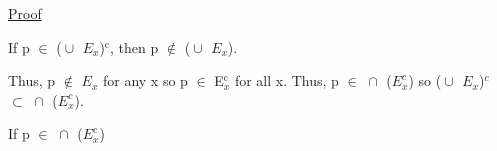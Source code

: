 	{ \color{magenta} \underline{Proof} } 
	
		If p $\in$ ($\cup_{}^{}$ $E_x$)$^\text{c}$, then p $\not \in$ ($\cup_{}^{}$ $E_x$).

		Thus, p $\not \in$ $E_x$ for any x so p $\in$ E$_x^\text{c}$ for all x.
		Thus, p $\in$ $\cap_{}^{}$ ($E_x^c$) so
		($\cup_{}^{}$ $E_x$)$^c$ $\subset$ $\cap_{}^{}$ ($E_x^c$).

		If p $\in$ $\cap_{}^{}$ ($E_x^c$)









\subsection{}











































